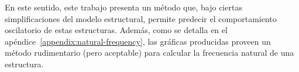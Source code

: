 En este sentido, este trabajo presenta un método que, bajo ciertas simplificaciones del modelo estructural, permite predecir el comportamiento oscilatorio de estas estructuras. Además, como se detalla en el apéndice~\ref{appendix:natural-frequency}, las gráficas producidas proveen un método rudimentario (pero aceptable) para calcular la frecuencia natural de una estructura.
